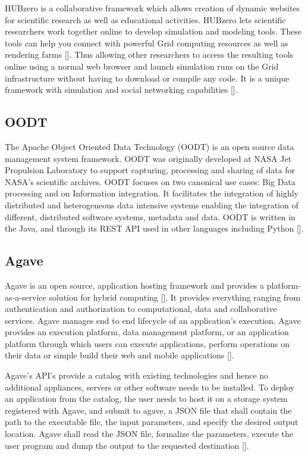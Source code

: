 HUBzero is a collaborative framework which allows creation of dynamic
websites for scientific research as well as educational activities.
HUBzero lets scientific researchers work together online to develop
simulation and modeling tools.  These tools can help you connect with
powerful Grid computing resources as well as rendering
farms [\cite{hubzerowebsite}]. Thus allowing other researchers to access
the resulting tools online using a normal web browser and launch
simulation runs on the Grid infrastructure without having to download
or compile any code. It is a unique framework with simulation and
social networking capabilities [\cite{hubzeropaper2010}].

\subsection{OODT}
     
The Apache Object Oriented Data Technology (OODT) is an open source
data management system framework. OODT was originally developed at
NASA Jet Propulsion Laboratory to support capturing, processing and
sharing of data for NASA's scientific archives. OODT focuses on two
canonical use cases: Big Data processing and on Information
integration. It facilitates the integration of highly distributed and
heterogeneous data intensive systems enabling the integration of
different, distributed software systems, metadata and data. OODT is
written in the Java, and through its REST API used in other languages
including Python [\cite{www-oodt2}].
     
\subsection{Agave}

Agave is an open source, application hosting framework and provides a
platform-as-a-service solution for hybrid
computing [\cite{agave-paper}]. It provides everything ranging from
authentication and authorization to computational, data and
collaborative services. Agave manages end to end lifecycle of an
application's execution.  Agave provides an execution platform, data
management platform, or an application platform through which users
can execute applications, perform operations on their data or simple
build their web and mobile applications [\cite{www-agaveapi-features}].

Agave's API's provide a catalog with existing technologies and hence
no additional appliances, servers or other software needs to be
installed. To deploy an application from the catalog, the user needs
to host it on a storage system registered with Agave, and submit to
agave, a JSON file that shall contain the path to the executable file,
the input parameters, and specify the desired output location. Agave
shall read the JSON file, formalize the parameters, execute the user
program and dump the output to the requested
destination [\cite{agave-paper}].

